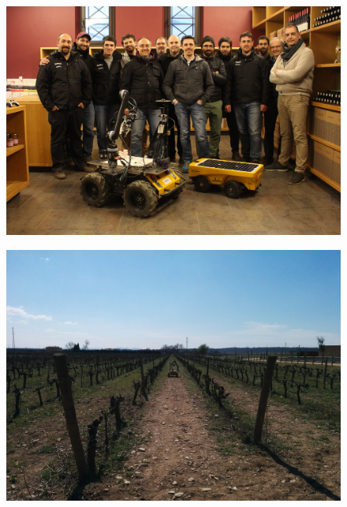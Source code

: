 
\markboth{}{}
\begin{figure}
	\centering
	\includegraphics[width=1.1\textwidth]{Images/gruppo_tagliata.JPG}
\end{figure}
\begin{figure}
	\centering
	\includegraphics[width=1.1\textwidth]{Images/robot_solo.jpg}
\end{figure}
